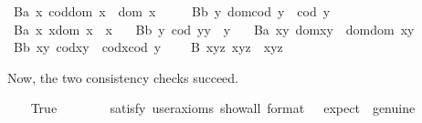 \begin{isabellebody}
\ B{}a{\isacharcolon}\ {\isachardoublequoteopen}\isactrlbold {\isasymforall}x{\isachardot}\ cod{\isacharparenleft}dom\ x{\isacharparenright}\ {\isasymcong}\ dom\ x\ {\isachardoublequoteclose}\ \ \ \isanewline
\ B{}b{\isacharcolon}\ {\isachardoublequoteopen}\isactrlbold {\isasymforall}y{\isachardot}\ dom{\isacharparenleft}cod\ y{\isacharparenright}\ {\isasymcong}\ cod\ y{\isachardoublequoteclose}\ \ \ \isanewline
\ B{}a{\isacharcolon}\ {\isachardoublequoteopen}\isactrlbold {\isasymforall}x{\isachardot}\ x{\isasymcdot}{\isacharparenleft}dom\ x{\isacharparenright}\ {\isasymcong}\ x{\isachardoublequoteclose}\ \ \isanewline
\ B{}b{\isacharcolon}\ {\isachardoublequoteopen}\isactrlbold {\isasymforall}y{\isachardot}\ {\isacharparenleft}cod\ y{\isacharparenright}{\isasymcdot}y\ {\isasymcong}\ y{\isachardoublequoteclose}\ \ \isanewline
\ B{}a{\isacharcolon}\ {\isachardoublequoteopen}\isactrlbold {\isasymforall}x{\isachardot}\isactrlbold {\isasymforall}y{\isachardot}\ dom{\isacharparenleft}x{\isasymcdot}y{\isacharparenright}\ {\isasymcong}\ dom{\isacharparenleft}{\isacharparenleft}dom\ x{\isacharparenright}{\isasymcdot}y{\isacharparenright}{\isachardoublequoteclose}\ \ \isanewline
\ B{}b{\isacharcolon}\ {\isachardoublequoteopen}\isactrlbold {\isasymforall}x{\isachardot}\isactrlbold {\isasymforall}y{\isachardot}\ cod{\isacharparenleft}x{\isasymcdot}y{\isacharparenright}\ {\isasymcong}\ cod{\isacharparenleft}x{\isasymcdot}{\isacharparenleft}cod\ y{\isacharparenright}{\isacharparenright}{\isachardoublequoteclose}\ \ \isanewline
\ \ B{}{\isacharcolon}\ {\isachardoublequoteopen}\isactrlbold {\isasymforall}x{\isachardot}\isactrlbold {\isasymforall}y{\isachardot}\isactrlbold {\isasymforall}z{\isachardot}\ x{\isasymcdot}{\isacharparenleft}y{\isasymcdot}z{\isacharparenright}\ {\isasymcong}\ {\isacharparenleft}x{\isasymcdot}y{\isacharparenright}{\isasymcdot}z{\isachardoublequoteclose}%
\begin{isamarkuptext}%
Now, the two consistency checks succeed.%
\end{isamarkuptext}\isamarkuptrue%
\ \ \isamarkupfalse%
\ True\ \ %
\isanewline
\ \ \ \ \isamarkupfalse%
\ {\isacharbrackleft}satisfy{\isacharcomma}\ user{\isacharunderscore}axioms{\isacharcomma}\ show{\isacharunderscore}all{\isacharcomma}\ format\ {\isacharequal}\ {}{\isacharcomma}\ expect\ {\isacharequal}\ genuine{\isacharbrackright}%

\end{isabellebody}

